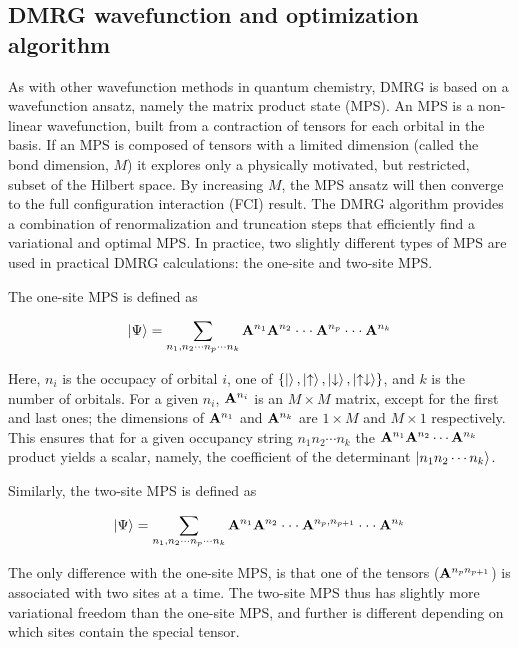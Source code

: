 
\subsection{DMRG wavefunction and optimization algorithm}

As with other wavefunction methods in quantum chemistry, DMRG is based on a wavefunction ansatz, namely the matrix product state (MPS).
An MPS is a non-linear wavefunction, built from a contraction of tensors for each orbital in the basis. If an MPS is
composed of tensors with a limited dimension (called the bond dimension, $M$) it explores only a physically motivated, but restricted, subset of the Hilbert space. 
By increasing $M$, the MPS ansatz will then converge to the full configuration interaction (FCI) result. The DMRG algorithm provides a combination of 
renormalization and truncation steps that efficiently find a variational and optimal MPS. 
In practice, two slightly different types of MPS are used in practical
DMRG calculations: the one-site and two-site MPS. 

The one-site MPS is defined as

\begin{equation}
  \ket{\Psi}= \sum_{\substack{n_1, n_2\cdot\cdot\cdot n_p\cdot\cdot\cdot n_k}} {\bf A}^{n_1}{\bf A}^{n_2}\cdot\cdot\cdot {\bf A}^{n_{p}} \cdot\cdot\cdot{\bf A}^{n_k}
\end{equation}

Here, $n_i$ is the occupacy of orbital $i$, one of $ \{\ket{}, \ket{\uparrow}, \ket{\downarrow}, \ket{\uparrow\downarrow}\}$, and $k$ is the number of orbitals. 
For a given $n_i$, ${\bf A}^{n_i}$ is  an $M\times M$ matrix, except for the first and last ones; the dimensions of ${\bf A}^{n_1}$ and ${\bf A}^{n_k}$ are $1\times M$ and $M\times 1$ respectively.
This ensures that for a given occupancy string $n_1n_2\cdots n_k$  the ${\bf A}^{n_1}{\bf A}^{n_2}\cdots{\bf A}^{n_k}$ product yields a scalar, 
namely, the coefficient of the determinant $\ket{n_1n_2\cdots n_k}$.

Similarly, the two-site MPS is defined as

\begin{equation}
  \ket{\Psi}= \sum_{\substack{n_1, n_2\cdot\cdot\cdot n_p\cdot\cdot\cdot n_k}} {\bf A}^{n_1}{\bf A}^{n_2}\cdot\cdot\cdot {\bf A}^{n_{p},n_{p+1}} \cdot\cdot\cdot{\bf A}^{n_k}
\end{equation}

The only difference with the one-site MPS, is that one of the tensors (${\bf A}^{n_p n_{p+1}}$) is associated with two sites at a time. The two-site MPS thus
has slightly more variational freedom than the one-site MPS, and further
is different depending on which sites contain the special tensor.

